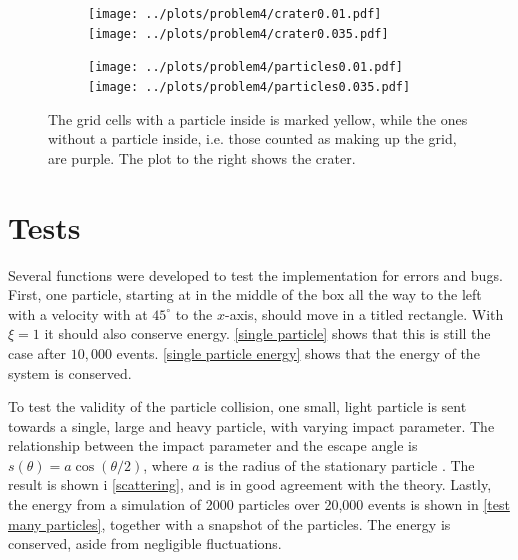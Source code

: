 \documentclass{article}
\begin{document}
    \begin{figure}[H]
        \centering
        \begin{subfigure}{.4\textwidth}                    
            \texttt{[image: ../plots/problem4/crater0.01.pdf]}
            \texttt{[image: ../plots/problem4/crater0.035.pdf]}
        \end{subfigure}
        \begin{subfigure}{.59\textwidth}                    
            \texttt{[image: ../plots/problem4/particles0.01.pdf]}
            \texttt{[image: ../plots/problem4/particles0.035.pdf]}
        \end{subfigure}
        \caption{The grid cells with a particle inside is marked yellow, while the ones without a particle inside, i.e. those counted as making up the grid, are purple. The plot to the right shows the crater.}
        \label{crater}
    \end{figure}


    \section*{Tests}
    Several functions were developed to test the implementation for errors and bugs. First, one particle, starting at in the middle of the box all the way to the left with a velocity with at $45^\circ$ to the $x$-axis, should move in a titled rectangle. With $\xi=1$ it should also conserve energy. \autoref{single particle} shows that this is still the case after $10,000$ events. \autoref{single particle energy} shows that the energy of the system is conserved.
    
    To test the validity of the particle collision, one small, light particle is sent towards a single, large and heavy particle, with varying impact parameter. The relationship between the impact parameter and the escape angle is $s(\theta) = a \cos(\theta / 2)$, where $a$ is the radius of the stationary particle \cite{klasmek}. The result is shown i \autoref{scattering}, and is in good agreement with the theory. Lastly, the energy from a simulation of 2000 particles over 20,000 events is shown in \autoref{test many particles}, together with a snapshot of the particles. The energy is conserved, aside from negligible fluctuations.
\end{document}
